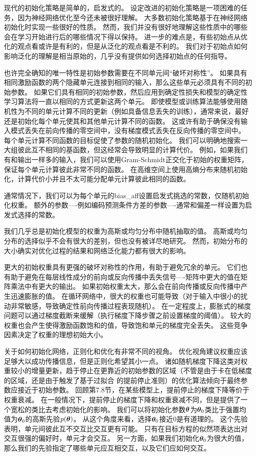 
现代的初始化策略是简单的，启发式的。
设定改进的初始化策略是一项困难的任务，因为神经网络优化至今还未被很好理解。
大多数初始化策略基于在神经网络初始化时实现一些很好的性质。
然而，我们并没有很好地理解这些性质中的哪些会在学习开始进行后的哪些情况下得以保持。
进一步的难点是，有些初始点从优化的观点看或许是有利的，但是从泛化的观点看是不利的。
我们对于初始点如何影响泛化的理解是相当原始的，几乎没有提供如何选择初始点的任何指导。

也许完全确知的唯一特性是初始参数需要在不同单元间“破坏对称性”。
如果具有相同激励函数的两个隐藏单元连接到相同的输入，那么这些单元必须具有不同的初始参数。
如果它们具有相同的初始参数，然后应用到确定性损失和模型的确定性学习算法将一直以相同的方式更新这两个单元。
即使模型或训练算法能够使用随机性为不同的单元计算不同的更新（例如具备信息丢失的训练），通常来说，最好还是初始化每个单元使其和其他单元计算不同的函数。
这或许有助于确保没有输入模式丢失在前向传播的零空间中，没有梯度模式丢失在反向传播的零空间中。
每个单元计算不同函数的目标促使了参数的随机初始化。
我们可以明确地搜索一大组彼此互不相同的基函数，但这经常会导致明显的计算代价。  
例如，如果我们有和输出一样多的输入，我们可以使用Gram-Schmidt正交化于初始的权重矩阵，保证每个单元计算彼此非常不同的函数。
在高维空间上使用高熵分布来随机初始化，计算代价小并且不太可能分配单元计算彼此相同的函数。

通常情况下，我们可以为每个单元的\gls{bias_aff}设置启发式挑选的常数，仅随机初始化权重。
额外的参数----例如编码预测条件方差的参数----通常和偏差一样设置为启发式选择的常数。

我们几乎总是初始化模型的权重为高斯或均匀分布中随机抽取的值。
高斯或均匀分布的选择似乎不会有很大的差别，但也没有被详尽地研究。
然而，初始分布的大小确实对优化过程的结果和网络泛化能力都有很大的影响。


更大的初始权重具有更强的破坏对称性的作用，有助于避免冗余的单元。
它们也有助于避免在每层线性成分的前向或反向传播中丢失信号----矩阵中更大的值在矩阵乘法中有更大的输出。
如果初始权重太大，那么会在前向传播或反向传播中产生迅速膨胀的值。
在循环网络中，很大的权重也可能导致（对于输入中很小的扰动非常敏感，导致确定性前向传播过程表现随机）。
在一定程度上，膨胀式的梯度问题可以通过梯度截断来缓解（执行梯度下降步骤之前设置梯度的阈值）。
较大的权重也会产生使得激励函数饱和的值，导致饱和单元的梯度完全丢失。
这些竞争因素决定了权重的理想初始大小。

关于如何初始化网络，正则化和优化有非常不同的视角。
优化视角建议权重应该足够大以成功传播信息，但是正则化希望其小一点。
诸如随机梯度下降这类对权重较小的增量更新，趋于停止在更靠近的初始参数的区域（不管是由于卡在低梯度的区域，还是由于触发了基于过拟合 的提前停止准则）的优化算法倾向于最终参数应接近于初始参数。
回顾第7.8节，在某些模型上，提前停止的梯度下降等价于权重衰减。
在一般情况下，提前停止的梯度下降和权重衰减不同，但是提供了一个宽松的类比去考虑初始化的影响。
我们可以将初始化参数$\boldsymbol{\theta}$为$\boldsymbol{\theta}_0$类比于强置均值为$\boldsymbol{\theta}_0$的高斯先验$p(\boldsymbol{\theta})$。
从这个角度来看，选择$\boldsymbol{\theta}_0$接近$0$是有道理的。
这个先验表明，单元间彼此互不交互比交互更有可能。
只有在目标方程的似然项表达出对交互很强的偏好时，单元才会交互。
另一方面，如果我们初始化$\boldsymbol{\theta}_0$为很大的值，那么我们的先验指定了哪些单元应互相交互，以及它们应如何交互。

